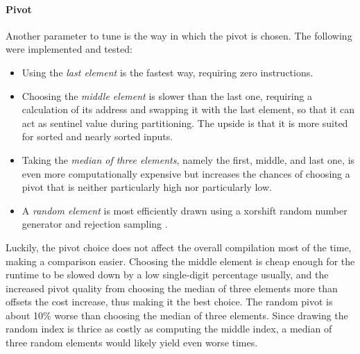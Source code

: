 \paragraph{Pivot}
Another parameter to tune is the way in which the pivot is chosen.
The following were implemented and tested:
\begin{itemize}
	\item
	Using the \emph{last element} is the fastest way, requiring zero instructions.

	\item
	Choosing the \emph{middle element} is slower than the last one, requiring a calculation of its address and swapping it with the last element, so that it can act as sentinel value during partitioning.
	The upside is that it is more suited for sorted and nearly sorted inputs.

	\item
	Taking the \emph{median of three elements}, namely the first, middle, and last one, is even more computationally expensive but increases the chances of choosing a pivot that is neither particularly high nor particularly low.

	\item
	A \emph{random element} is most efficiently drawn using a xorshift random number generator and rejection sampling \cite{lukas_geis}.
\end{itemize}
Luckily, the pivot choice does not affect the overall compilation most of the time, making a comparison easier.
Choosing the middle element is cheap enough for the runtime to be slowed down by a low single-digit percentage usually, and the increased pivot quality from choosing the median of three elements more than offsets the cost increase, thus making it the best choice.
The random pivot is about 10\% worse than choosing the median of three elements.
Since drawing the random index is thrice as costly as computing the middle index, a median of three random elements would likely yield even worse times.
